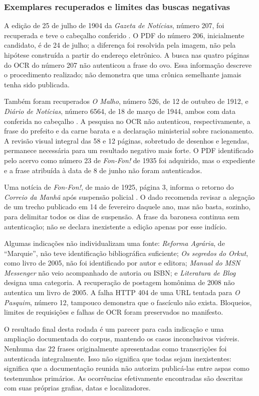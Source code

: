 \subsubsection{Exemplares recuperados e limites das buscas negativas}
A edição de 25 de julho de 1904 da \textit{Gazeta de Notícias}, número 207, foi recuperada e teve o cabeçalho conferido \cite{r2gazeta1904}. O PDF do número 206, inicialmente candidato, é de 24 de julho; a diferença foi resolvida pela imagem, não pela hipótese construída a partir do endereço eletrônico. A busca nas quatro páginas do OCR do número 207 não autenticou a frase do ovo. Essa informação descreve o procedimento realizado; não demonstra que uma crônica semelhante jamais tenha sido publicada.

Também foram recuperados \textit{O Malho}, número 526, de 12 de outubro de 1912, e \textit{Diário de Notícias}, número 6564, de 18 de março de 1944, ambos com data conferida no cabeçalho \cite{r2malho1912,r2diario1944}. A pesquisa no OCR não autenticou, respectivamente, a frase do prefeito e da carne barata e a declaração ministerial sobre racionamento. A revisão visual integral das 58 e 12 páginas, sobretudo de desenhos e legendas, permanece necessária para um resultado negativo mais forte. O PDF identificado pelo acervo como número 23 de \textit{Fon-Fon!} de 1935 foi adquirido, mas o expediente e a frase atribuída à data de 8 de junho não foram autenticados.

Uma notícia de \textit{Fon-Fon!}, de maio de 1925, página 3, informa o retorno do \textit{Correio da Manhã} após suspensão policial \cite{r2fon1925}. O dado recomenda revisar a alegação de um trecho publicado em 14 de fevereiro daquele ano, mas não basta, sozinho, para delimitar todos os dias de suspensão. A frase da baronesa continua sem autenticação; não se declara inexistente a edição apenas por esse indício.

Algumas indicações não individualizam uma fonte: \textit{Reforma Agrária}, de ``Marquie'', não teve identificação bibliográfica suficiente; \textit{Os segredos do Orkut}, como livro de 2005, não foi identificado por autor e editora; \textit{Manual do MSN Messenger} não veio acompanhado de autoria ou ISBN; e \textit{Literatura de Blog} designa uma categoria. A recuperação de postagem homônima de 2008 não autentica um livro de 2005. A falha HTTP 404 de uma URL tentada para \textit{O Pasquim}, número 12, tampouco demonstra que o fascículo não exista. Bloqueios, limites de requisições e falhas de OCR foram preservados no manifesto.

O resultado final desta rodada é um parecer para cada indicação e uma ampliação documentada do corpus, mantendo os casos inconclusivos visíveis. Nenhuma das 22 frases originalmente apresentadas como transcrições foi autenticada integralmente. Isso não significa que todas sejam inexistentes: significa que a documentação reunida não autoriza publicá-las entre aspas como testemunhos primários. As ocorrências efetivamente encontradas são descritas com suas próprias grafias, datas e localizadores.

